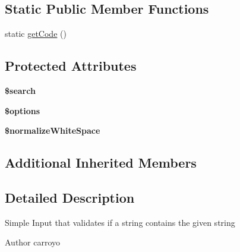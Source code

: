 \subsection*{Static Public Member Functions}
\begin{DoxyCompactItemize}
\item 
static \hyperlink{classDMA_1_1Friends_1_1Classes_1_1Notifications_1_1Inputs_1_1InputContains_a81a8b19854625a3cb7cf011149a0960a}{get\-Code} ()
\end{DoxyCompactItemize}
\subsection*{Protected Attributes}
\begin{DoxyCompactItemize}
\item 
\hypertarget{classDMA_1_1Friends_1_1Classes_1_1Notifications_1_1Inputs_1_1InputContains_abb89a8c2f31d012122a9e55921dc3c64}{{\bfseries \$search}}\label{classDMA_1_1Friends_1_1Classes_1_1Notifications_1_1Inputs_1_1InputContains_abb89a8c2f31d012122a9e55921dc3c64}

\item 
\hypertarget{classDMA_1_1Friends_1_1Classes_1_1Notifications_1_1Inputs_1_1InputContains_ac5addad5295ef180418a1b10080d5a1f}{{\bfseries \$options}}\label{classDMA_1_1Friends_1_1Classes_1_1Notifications_1_1Inputs_1_1InputContains_ac5addad5295ef180418a1b10080d5a1f}

\item 
\hypertarget{classDMA_1_1Friends_1_1Classes_1_1Notifications_1_1Inputs_1_1InputContains_a26ecdaf38bdb16787a09c4e671d63eac}{{\bfseries \$normalize\-White\-Space}}\label{classDMA_1_1Friends_1_1Classes_1_1Notifications_1_1Inputs_1_1InputContains_a26ecdaf38bdb16787a09c4e671d63eac}

\end{DoxyCompactItemize}
\subsection*{Additional Inherited Members}


\subsection{Detailed Description}
Simple Input that validates if a string contains the given string \begin{DoxyAuthor}{Author}
carroyo 
\end{DoxyAuthor}



